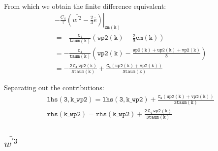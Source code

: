 \documentclass[11pt,fleqn]{article}
\begin{document}
From which we obtain the finite difference equivalent:
%
\begin{equation}
\begin{split}
& \left.
  - \frac{C_4}{\tau} 
    \left( \overline{w^{'2}} - \frac{2}{3} \bar{e} 
    \right)
  \right|_{\mathtt{zm(k)}} \\
&= \mathtt{ -\frac{C_4}{taum(k)} 
    \left( 
      wp2(k) - \frac{2}{3} em(k) 
    \right) 
   } \\
&= \mathtt{ -\frac{C_4}{taum(k)} 
             \left(
               wp2(k) - \frac{wp2(k) + up2(k) + vp2(k)}{3}
             \right)
          } \\
&= \mathtt{ -\frac{2 \, C_4 \, wp2(k)}{3 taum(k)} + \frac{C_4 \left( up2(k) + vp2(k) \right)}{3 taum(k)} }
\end{split}
\end{equation}
%

Separating out the contributions:
%
\begin{equation}
\begin{split}
& \mathtt{
  lhs(3,k\_wp2) = lhs(3,k\_wp2) + \frac{C_4 \left( up2(k) + vp2(k) \right)}{3 taum(k) }
  } \\
& \mathtt{
  rhs(k\_wp2) = rhs(k\_wp2) + \frac{2 \, C_4 \, wp2(k) }{3 taum(k)} 
  }
\end{split}
\end{equation}


\subsection{$\overline{w^{'3}}$}
\end{document}
